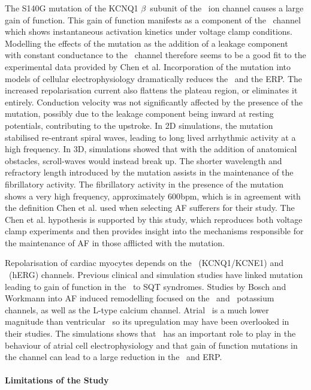 The S140G mutation of the KCNQ1 $\beta$\ subunit of the \ ion channel
causes a large gain of function.
This gain of function manifests as a component of the \ channel which
shows instantaneous activation kinetics under voltage clamp conditions.
Modelling the effects of the mutation as the addition of a leakage component
with constant conductance to the \ channel therefore seems to be a good
fit to the experimental data provided by Chen et al.
Incorporation of the mutation into models of cellular electrophysiology
dramatically reduces the \apd\ and the ERP.
The increased repolarisation current also flattens the plateau region, or
eliminates it entirely.
Conduction velocity was not significantly affected by the presence of the
mutation, possibly due to the leakage component being inward at resting
potentials, contributing to the upstroke.
In 2D simulations, the mutation stabilised re-entrant spiral waves, leading to
long lived arrhythmic activity at a high frequency.
In 3D, simulations showed that with the addition of anatomical obstacles,
scroll-waves would instead break up.
The shorter wavelength and refractory length introduced by the mutation assists
in the maintenance of the fibrillatory activity.
The fibrillatory activity in the presence of the mutation shows a very high
frequency, approximately \unit{600}{bpm}, which is in agreement with the
definition Chen et al. used when selecting AF sufferers for their study.
The Chen et al. hypothesis is supported by this study, which reproduces both
voltage clamp experiments and then provides insight into the mechanisms
responsible for the maintenance of AF in those afflicted with the mutation.

Repolarisation of cardiac myocytes depends on the \ (KCNQ1/KCNE1) and
\ (hERG) channels.
Previous clinical and simulation studies have linked mutation leading to
gain of function in the \ to SQT syndromes.
Studies by Bosch and Workmann into AF induced remodelling focused on the
\ and \ potassium channels, as well as the L-type calcium channel.
Atrial \ is a much lower magnitude than ventricular \ so its
upregulation may have been overlooked in their studies.
The simulations shows that \ has an important role to play in the behaviour
of atrial cell electrophysiology and that gain of function mutations in the
channel can lead to a large reduction in the \apd\ and ERP.

\paragraph{Limitations of the Study}

